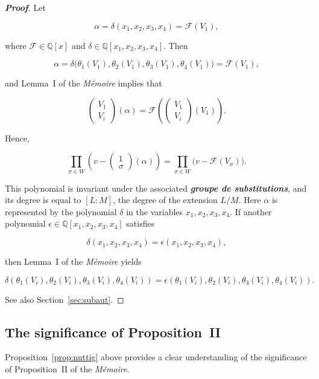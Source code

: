 \documentclass[a4paper,11pt]{article}
\begin{document}
\begin{proof}[\normalfont\bfseries Proof]

Let

\[
\alpha=\delta(x_1,x_2,x_3,x_4)=\mathcal{F}(V_1),
\]

where \(\mathcal{F}\in\mathbb{Q}[x]\) and \(\delta\in\mathbb{Q}[x_1,x_2,x_3,x_4]\). Then

\[
\alpha=
\delta\bigl(\theta_1(V_1),\theta_2(V_1),\theta_3(V_1),\theta_4(V_1)\bigr)
=\mathcal{F}(V_1),
\]

and Lemma~I of the \textit{Mémoire} implies that

\[
\begin{pmatrix}
	V_1\\
	V_i
\end{pmatrix}
(\alpha)
=
\mathcal{F}
\left(
\begin{pmatrix}
	V_1\\
	V_i
\end{pmatrix}
(V_1)
\right).
\]

Hence,

\[
\prod_{\sigma\in W}
\left(
v-
\begin{pmatrix}
	1\\
	\sigma
\end{pmatrix}(\alpha)
\right)
=
\prod_{\sigma\in W}
\bigl(v-\mathcal{F}(V_\sigma)\bigr).
\]

This polynomial is invariant under the associated \textbf{\textit{groupe de substitutions}}, and its degree is equal to \([L:M]\), the degree of the extension \(L/M\). Here \(\alpha\) is represented by the polynomial \(\delta\) in the variables \(x_1,x_2,x_3,x_4\). If another polynomial \(\epsilon\in\mathbb{Q}[x_1,x_2,x_3,x_4]\) satisfies

\[
\delta(x_1,x_2,x_3,x_4)
=
\epsilon(x_1,x_2,x_3,x_4),
\]

then Lemma~I of the \textit{Mémoire} yields

\[
\delta(\theta_1(V_i),\theta_2(V_i),\theta_3(V_i),\theta_4(V_i))
=
\epsilon(\theta_1(V_i),\theta_2(V_i),\theta_3(V_i),\theta_4(V_i)).
\]

See also Section~\ref{sec:subaut}.

\end{proof}

\subsection{The significance of Proposition~II}

Proposition~\ref{prop:nuttig} above provides a clear understanding of the significance of Proposition~II of the \textit{Mémoire}.
\end{document}
